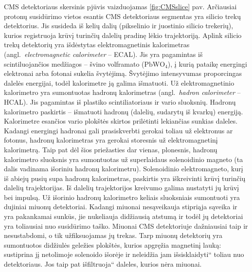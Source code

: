 \documentclass[a4paper, 12pt]{article}
\newcommand{\ltq}[1]{{\quotedblbase{}#1\textquotedblleft{}}}
\newlength\q
\begin{document}
CMS detektoriaus skersinis pjūvis vaizduojamas \ref{fig:CMSslice} pav. Arčiausiai protonų susidūrimo vietos esantis CMS detektoriaus segmentas yra silicio trekų detektorius. Jis susideda iš kelių dalių (pikselinio ir juostinio silicio trekerių), kurios registruoja krūvį turinčių dalelių pradinę lėkio trajektoriją. Aplink silicio trekų detektorių yra išdėstytas elektromagnetinis kalorimetras (angl.\ \textit{electromagnetic calorimeter} -- ECAL). Jis yra pagamintas iš scintiluojančios medžiagos -- švino volframato ($\mathrm{PbWO}_{4}$), į kurią pataikę energingi elektronai arba fotonai sukelia švytėjimą. Švytėjimo intensyvumas proporcingas dalelės energijai, todėl kalorimetre ją galima išmatuoti\cite{Ecal}. Už elektromagnetinio kalorimetro yra sumontuotas hadronų kalorimetras (angl.\ \textit{hadron calorimeter} -- HCAL). Jis pagamintas iš plastiko scintiliatoriaus ir vario sluoksnių. Hadronų kalorimetro paskirtis -- išmatuoti hadronų (dalelių, sudarytų iš kvarkų) energiją. Kalorimetre esančios vario plokštės skirtos prilėtinti lekiančias sunkias daleles. Kadangi energingi hadronai gali prasiskverbti gerokai toliau už elektronus ar fotonus, hadronų kalorimetras yra gerokai storesnis už elektromagnetinį kalorimetrą. Taip pat  dėl šios priežasties dar vienas, plonesnis, hadronų kalorimetro sluoksnis yra sumontuotas už superlaidaus solenoidinio magneto (ta dalis vadinama išoriniu hadronų kalorimetru). Solenoidinio elektromagneto, kurį iš abiejų pusių supa hadronų kalorimetras, paskirtis yra iškreivinti krūvį turinčių dalelių trajektorijas. Iš dalelių trajektorijos kreivumo galima nustatyti jų krūvį bei impulsą. Už išorinio hadronų kalorimetro keliais sluoksniais sumontuoti yra dujiniai miuonų detektoriai. Kadangi miuonai nesąveikauja stipriąja sąveika ir yra pakankamai sunkūs, jie nukeliauja didžiausią atstumą ir todėl jų detektoriai yra toliausiai nuo susidūrimo taško. Miuonai CMS detektoriuje dažniausiai taip ir nesustabdomi, o tik užfiksuojamas jų trekas. Tarp miuonų detektorių yra sumontuotos didžiulės geležies plokštės, kurios apgręžia magnetinį lauką: sustiprina jį netolimoje solenoido išorėje ir neleidžia jam \ltq{išsisklaidyti} toliau nuo detektoriaus. Jos taip pat \ltq{išfiltruoja} daleles, kurios nėra miuonai\cite{Solenoid}.
\end{document}
